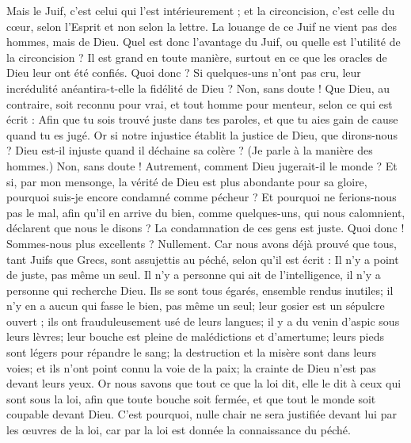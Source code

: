 \begin{multicols}{2}
Mais le Juif, c'est celui qui l'est intérieurement ; et la circoncision, c'est celle du cœur, selon l'Esprit et non selon la lettre. La louange de ce Juif ne vient pas des hommes, mais de Dieu.
\VerseOne{}Quel est donc l'avantage du Juif, ou quelle est l'utilité de la circoncision ?
Il est grand en toute manière, surtout en ce que les oracles de Dieu leur ont été confiés.
Quoi donc ? Si quelques-uns n'ont pas cru, leur incrédulité anéantira-t-elle la fidélité de Dieu ?
Non, sans doute ! Que Dieu, au contraire, soit reconnu pour vrai, et tout homme pour menteur, selon ce qui est écrit : Afin que tu sois trouvé juste dans tes paroles, et que tu aies gain de cause quand tu es jugé.
Or si notre injustice établit la justice de Dieu, que dirons-nous ? Dieu est-il injuste quand il déchaine sa colère ? (Je parle à la manière des hommes.)
Non, sans doute ! Autrement, comment Dieu jugerait-il le monde ?
Et si, par mon mensonge, la vérité de Dieu est plus abondante pour sa gloire, pourquoi suis-je encore condamné comme pécheur ?
Et pourquoi ne ferions-nous pas le mal, afin qu'il en arrive du bien, comme quelques-uns, qui nous calomnient, déclarent que nous le disons ? La condamnation de ces gens est juste.
Quoi donc ! Sommes-nous plus excellents ? Nullement. Car nous avons déjà prouvé que tous, tant Juifs que Grecs, sont assujettis au péché,
selon qu'il est écrit : Il n'y a point de juste, pas même un seul.
Il n'y a personne qui ait de l'intelligence, il n'y a personne qui recherche Dieu.
Ils se sont tous égarés, ensemble rendus inutiles; il n'y en a aucun qui fasse le bien, pas même un seul;
leur gosier est un sépulcre ouvert ; ils ont frauduleusement usé de leurs langues; il y a du venin d'aspic sous leurs lèvres;
leur bouche est pleine de malédictions et d'amertume;
leurs pieds sont légers pour répandre le sang;
la destruction et la misère sont dans leurs voies;
et ils n'ont point connu la voie de la paix;
la crainte de Dieu n'est pas devant leurs yeux.
Or nous savons que tout ce que la loi dit, elle le dit à ceux qui sont sous la loi, afin que toute bouche soit fermée, et que tout le monde soit coupable devant Dieu.
C'est pourquoi, nulle chair ne sera justifiée devant lui par les œuvres de la loi, car par la loi est donnée la connaissance du péché.

\end{multicols}
